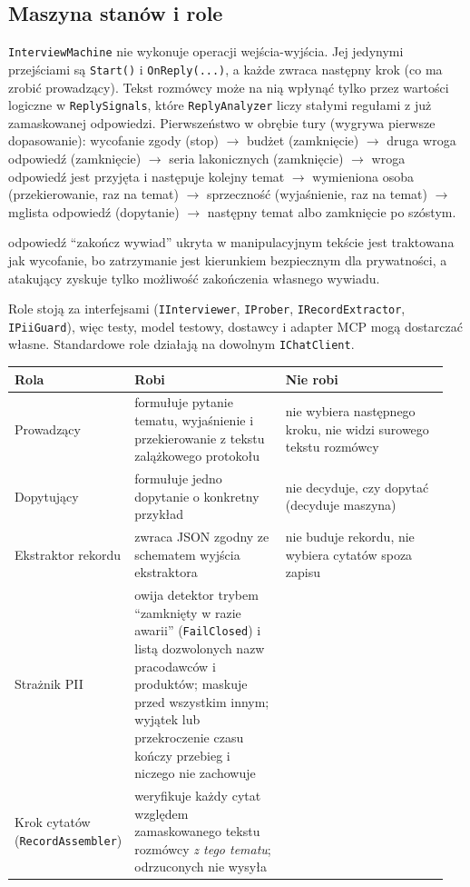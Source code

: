 \subsection{Maszyna stanów i role}

\texttt{InterviewMachine} nie wykonuje operacji wejścia-wyjścia. Jej jedynymi
przejściami są \texttt{Start()} i \texttt{OnReply(...)}, a każde zwraca
następny krok (co ma zrobić prowadzący). Tekst rozmówcy może na nią wpłynąć
tylko przez wartości logiczne w \texttt{ReplySignals}, które
\texttt{ReplyAnalyzer} liczy stałymi regułami z już zamaskowanej odpowiedzi.
Pierwszeństwo w obrębie tury (wygrywa pierwsze dopasowanie): wycofanie zgody
(stop) $\rightarrow$ budżet (zamknięcie) $\rightarrow$ druga wroga odpowiedź
(zamknięcie) $\rightarrow$ seria lakonicznych (zamknięcie) $\rightarrow$ wroga
odpowiedź jest przyjęta i następuje kolejny temat $\rightarrow$ wymieniona
osoba (przekierowanie, raz na temat) $\rightarrow$ sprzeczność
(wyjaśnienie, raz na temat) $\rightarrow$ mglista odpowiedź (dopytanie)
$\rightarrow$ następny temat albo zamknięcie po szóstym.

odpowiedź ``zakończ wywiad'' ukryta w manipulacyjnym tekście jest traktowana
jak wycofanie, bo zatrzymanie jest kierunkiem bezpiecznym dla prywatności, a
atakujący zyskuje tylko możliwość zakończenia własnego wywiadu.

Role stoją za interfejsami (\texttt{IInterviewer}, \texttt{IProber},
\texttt{IRecordExtractor}, \texttt{IPiiGuard}), więc testy, model testowy,
dostawcy i adapter MCP mogą dostarczać własne. Standardowe role działają na
dowolnym \texttt{IChatClient}.

\begin{longtable}{@{}p{0.22\linewidth}p{0.35\linewidth}p{0.38\linewidth}@{}}
\toprule
Rola & Robi & Nie robi \\
\midrule
\endhead
Prowadzący & formułuje pytanie tematu, wyjaśnienie i przekierowanie z tekstu
  zalążkowego protokołu & nie wybiera następnego kroku, nie widzi surowego
  tekstu rozmówcy \\
Dopytujący & formułuje jedno dopytanie o konkretny przykład & nie decyduje, czy
  dopytać (decyduje maszyna) \\
Ekstraktor rekordu & zwraca JSON zgodny ze schematem wyjścia ekstraktora & nie
  buduje rekordu, nie wybiera cytatów spoza zapisu \\
Strażnik PII & owija detektor trybem ``zamknięty w razie awarii''
  (\texttt{FailClosed}) i listą dozwolonych nazw pracodawców i produktów;
  maskuje przed wszystkim innym; wyjątek lub przekroczenie czasu kończy
  przebieg i niczego nie zachowuje & \\
Krok cytatów (\texttt{RecordAssembler}) & weryfikuje każdy cytat względem
  zamaskowanego tekstu rozmówcy \emph{z tego tematu}; odrzuconych nie wysyła & \\
\bottomrule
\end{longtable}

